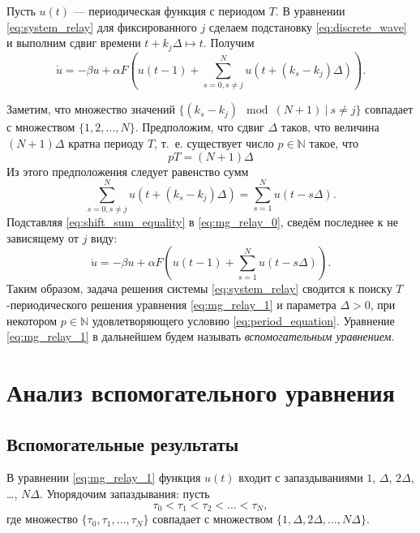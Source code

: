 Пусть $u(t)$ --- периодическая функция с периодом $T$. В уравнении \eqref{eq:system_relay} для фиксированного $j$ сделаем подстановку \eqref{eq:discrete_wave} и выполним сдвиг времени $t + k_j \Delta \mapsto t$. Получим
%
\begin{equation}
	\label{eq:mg_relay_0}
	\dot{u} = -\beta u + \alpha F\left(u(t-1)+ \sum_{s=0, s\neq j}^{N}u(t+(k_s-k_j)\Delta)\right).
\end{equation}

Заметим, что множество значений $\{(k_s - k_j) \mod (N + 1) \ | \ s \neq j\}$ совпадает с множеством $\{1, 2, \ldots, N\}$. Предположим, что сдвиг $\Delta$ таков, что величина $(N + 1) \Delta$ кратна периоду $T$, т.~е. существует число $p \in \mathbb{N}$ такое, что
%
\begin{equation}
	\label{eq:period_equation}
	pT = (N + 1)\Delta
\end{equation}
%
Из этого предположения следует равенство сумм
%
\begin{equation}
	\label{eq:shift_sum_equality}
	\sum\limits_{s=0, s\neq j}^{N}u(t+(k_s-k_j)\Delta)=\sum\limits_{s=1}^{N}u(t-s\Delta).
\end{equation}
%
Подставляя \eqref{eq:shift_sum_equality} в \eqref{eq:mg_relay_0}, сведём последнее к не зависящему от $j$ виду:
%
\begin{equation}
	\label{eq:mg_relay_1}
	\dot{u}=-\beta u+\alpha F\left(u(t-1)+ \sum_{s=1}^{N}u(t-s\Delta)\right).
\end{equation}
%
Таким образом, задача решения системы \eqref{eq:system_relay} сводится к поиску $T$-периодического решения уравнения \eqref{eq:mg_relay_1} и параметра $\Delta > 0$, при некотором $p \in \mathbb{N}$ удовлетворяющего условию \eqref{eq:period_equation}. Уравнение \eqref{eq:mg_relay_1} в дальнейшем будем называть \emph{вспомогательным уравнением}.

\section{Анализ вспомогательного уравнения}\label{sec:ch2/sect2}

\subsection{Вспомогательные результаты}\label{sec:ch2/sect2/subsect_aux_result}

В уравнении \eqref{eq:mg_relay_1} функция $u(t)$ входит с запаздываниями $1$, $\Delta$, $2\Delta$, \dots, $N\Delta$. Упорядочим запаздывания: пусть
$$\tau_0 < \tau_1 < \tau_2 < \ldots < \tau_N,$$
где множество $\{\tau_0, \tau_1, \ldots, \tau_N\}$ совпадает с множеством $\{1, \Delta, 2\Delta, \ldots, N\Delta\}$.

